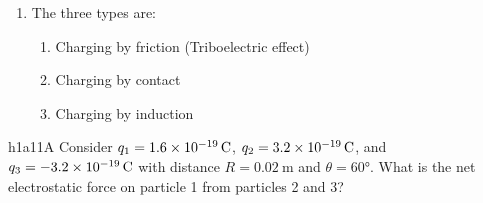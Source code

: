 {\begin{answers}
\begin{enumerate}
\begin{enumerate}
            \begin{equation*}
              \oint \Vec{B} \cdot \mathrm{d}\Vec{A} = 0
            \end{equation*}
            i.e. the magnetic flux through a closed surface is zero (law of no magnetic monopoles).
        \end{enumerate}
      \item The three types are:
        \begin{enumerate}
          \item Charging by friction (Triboelectric effect)
          \item Charging by contact
          \item Charging by induction
        \end{enumerate}
    \end{enumerate}
  \end{answers}
}
  

  \begin{problemwithimage}{h1a1}{1A}
    Consider $q_1 = \qty{1,6e-19}{\C}$, $q_2 = \qty{3,2e-19}{\C}$, and $q_3 = \qty{-3,2e-19}{\C} $ with distance $R = \qty{0,02}{\m}$ and $\theta = \ang{60} $.
    What is the net electrostatic force on particle 1 from particles 2 and 3?
  \end{problemwithimage}

